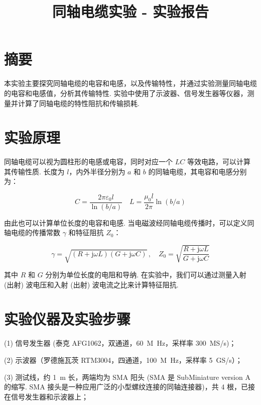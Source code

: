 \documentclass{customDoc}
\begin{document}
\title{同轴电缆实验 - 实验报告}
\maketitle

\section{摘要}

本实验主要探究同轴电缆的电容和电感，以及传输特性，并通过实验测量同轴电缆的电容和电感值，分析其传输特性. 实验中使用了示波器、信号发生器等仪器，测量并计算了同轴电缆的特性阻抗和传输损耗.

\section{实验原理}

同轴电缆可以视为圆柱形的电感或电容，同时对应一个 $LC$ 等效电路，可以计算其传输性质. 长度为 $l$，内外半径分别为 $a$ 和 $b$ 的同轴电缆，其电容和电感分别为：

\begin{equation}
    C = \frac{2\pi\varepsilon_0l}{\ln(b/a)} \quad L = \frac{\mu_0l}{2\pi}\ln(b/a)
\end{equation}

由此也可以计算单位长度的电容和电感. 当电磁波经同轴电缆传播时，可以定义同轴电缆的传播常数 $\gamma$ 和特征阻抗 $Z_0$：

\begin{equation}
    \gamma = \sqrt{(R+\text{j}\omega L)(G+\text{j}\omega C)}\,,\quad Z_0 = \sqrt{\frac{R+\text{j}\omega L}{G + \text{j}\omega C}}
\end{equation}

其中 $R$ 和 $G$ 分别为单位长度的电阻和导纳. 在实验中，我们可以通过测量入射 (出射) 波电压和入射 (出射) 波电流之比来计算特征阻抗.

\section{实验仪器及实验步骤}

(1) 信号发生器 (泰克 AFG1062，双通道，\SI{60}{M\hertz}，采样率 \SI{300}{MS/s})；

(2) 示波器（罗德施瓦茨 RTM3004，四通道，\SI{100}{M\hertz}，采样率 \SI{5}{GS/s}）；

(3) 测试线，约 \SI{1}{m} 长，两端均为 SMA 阳头 (SMA 是 SubMiniature version A 的缩写. SMA 接头是一种应用广泛的小型螺纹连接的同轴连接器)，共 4 根，已接在信号发生器和示波器上；
\end{document}

